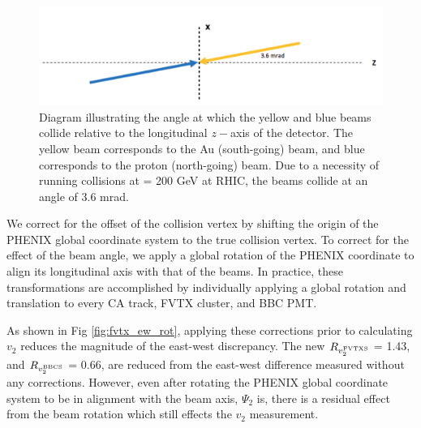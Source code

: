 \begin{figure}[!ht]
\begin{center}
\includegraphics[width=0.75\linewidth]{figs/beam_angle.png}
\caption{Diagram illustrating the angle at which the yellow and blue beams collide relative to the longitudinal $z-$axis of the detector. The yellow beam corresponds to the Au (south-going) beam, and blue corresponds to the proton (north-going) beam. Due to a necessity of running \pau collisions at \sqsn = 200 GeV at RHIC, the beams collide at an angle of 3.6 mrad.}
\label{fig:diagram2}
\end{center}
\end{figure}

We correct for the offset of the collision vertex by shifting the origin of the PHENIX global coordinate system to the true collision vertex. To correct for the effect of the beam angle, we apply a global rotation of the PHENIX coordinate to align its longitudinal axis with that of the beams. In practice, these transformations are accomplished by individually applying a global rotation and translation to every CA track, FVTX cluster, and BBC PMT. 

As shown in Fig \ref{fig:fvtx_ew_rot}, applying these corrections prior to calculating $v_2$ reduces the magnitude of the east-west discrepancy. The new $R_{v_2^{\rm FVTXS}}$ = 1.43, and $R_{v_2^{\rm BBCS}}$ = 0.66, are reduced from the east-west difference measured without any corrections. However, even after rotating the PHENIX global coordinate system to be in alignment with the beam axis, $\Psi_2$ is, there is a residual effect from the beam rotation which still effects the $v_2$ measurement. 

